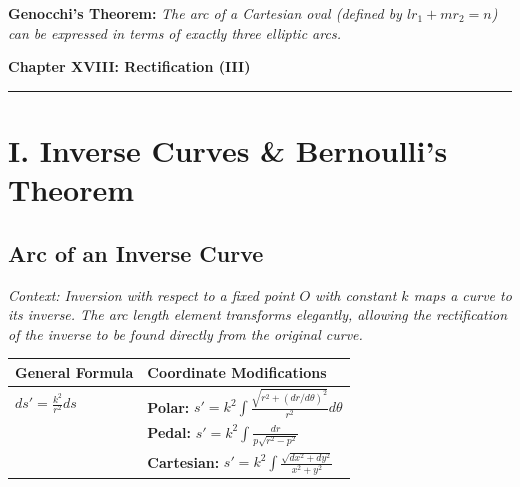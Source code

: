 \documentclass[11pt, a4paper]{article}
\begin{document}
\textbf{\color{accent}Genocchi's Theorem:} \textit{\small The arc of a Cartesian oval (defined by $l r_1 + m r_2 = n$) can be expressed in terms of exactly three elliptic arcs.}

\newpage

\begin{center}
    {\LARGE \bfseries \color{accent} Chapter XVIII: Rectification (III)}\\
    \vspace{0.2cm}
    {\color{accent}\rule{0.55\linewidth}{0.8pt}}
\end{center}
\vspace{0.35cm}

\begin{center}
\end{center}


\section*{\color{primary} I. Inverse Curves \& Bernoulli's Theorem}

\subsection*{\color{secondary} Arc of an Inverse Curve}
\textit{\small Context: Inversion with respect to a fixed point $O$ with constant $k$ maps a curve to its inverse. The arc length element transforms elegantly, allowing the rectification of the inverse to be found directly from the original curve.}
\begin{center}
\begin{tabular}{@{}p{} p{}@{}}
\toprule
\textbf{General Formula} & \textbf{Coordinate Modifications} \\
\midrule
$ds' = \frac{k^2}{r^2} ds$ & \textbf{\color{accent}Polar:} $s' = k^2 \int \frac{\sqrt{r^2 + (dr/d\theta)^2}}{r^2} d\theta$ \\
& \textbf{\color{accent}Pedal:} $s' = k^2 \int \frac{dr}{p\sqrt{r^2-p^2}}$ \\
& \textbf{\color{accent}Cartesian:} $s' = k^2 \int \frac{\sqrt{dx^2+dy^2}}{x^2+y^2}$ \\
\bottomrule
\end{tabular}
\end{center}
\end{document}
